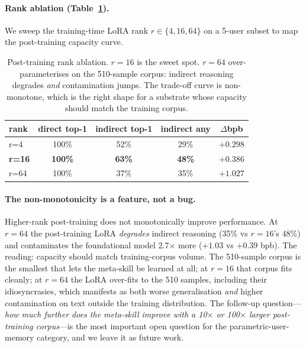 \documentclass{article}
\begin{document}
\paragraph{Rank ablation (Table~\ref{tab:rank-ablation}).}
We sweep the training-time LoRA rank $r \in \{4, 16, 64\}$ on a 5-user
subset to map the post-training capacity curve.

\begin{table}[t]
  \centering
  \caption{Post-training rank ablation. $r{=}16$ is the sweet spot.
  $r{=}64$ over-parameterises on the 510-sample corpus: indirect
  reasoning degrades \emph{and} contamination jumps. The trade-off
  curve is non-monotone, which is the right shape for a substrate
  whose capacity should match the training corpus.}
  \label{tab:rank-ablation}
  \begin{tabular}{lcccc}
    \toprule
    rank & direct top-1 & indirect top-1 & indirect any & $\Delta$bpb \\
    \midrule
    r=4    & 100\% & 52\% & 29\% & $+0.298$ \\
    \textbf{r=16}   & \textbf{100\%} & \textbf{63\%} & \textbf{48\%} & \textbf{$+0.386$} \\
    r=64   & 100\% & 37\% & 35\% & $+1.027$ \\
    \bottomrule
  \end{tabular}
\end{table}

\paragraph{The non-monotonicity is a feature, not a bug.}
Higher-rank post-training does not monotonically improve performance.
At $r{=}64$ the post-training LoRA \emph{degrades} indirect reasoning
(35\% vs $r{=}16$'s 48\%) and contaminates the foundational model
2.7$\times$ more ($+1.03$ vs $+0.39$ bpb). The reading: capacity should
match training-corpus volume. The 510-sample corpus is the smallest
that lets the meta-skill be learned at all; at $r{=}16$ that corpus
fits cleanly; at $r{=}64$ the LoRA over-fits to the 510 samples,
including their idiosyncrasies, which manifests as both worse
generalisation \emph{and} higher contamination on text outside the
training distribution. The follow-up question—\emph{how much further
does the meta-skill improve with a 10$\times$ or 100$\times$ larger
post-training corpus}—is the most important open question for the
parametric-user-memory category, and we leave it as future work.
\end{document}

